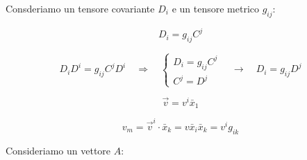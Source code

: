 \newpage

Consderiamo un tensore covariante $D_i$ e un tensore metrico $g_{ij}$:

$$
D_i = g_{ij} C^j
$$


$$
D_i D^i = g_{ij} C^j D^i \quad \Rightarrow \quad 
\begin{cases}
    D_i = g_{ij} C^j\\
    C^j = D^j
\end{cases}
\quad \rightarrow \quad 
D_i = g_{ij} D^j
$$

\vspace{5em}

$$
\vec v = v^i \bar x_1
$$

$$
v_m = \vec v^i \cdot \bar x_k = v \bar x_i \bar x_k = v^i g_{ik}
$$

Consideriamo un vettore $A$:

$$
